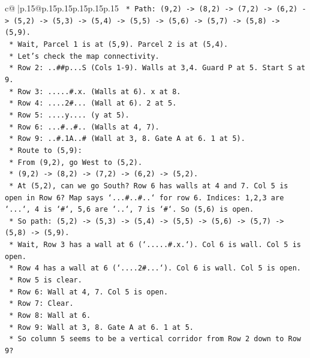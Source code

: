\documentclass{article}
\begin{document}
{\begin{supertabular}{c@{$\;$}|p{.15\linewidth}@{}p{.15\linewidth}p{.15\linewidth}p{.15\linewidth}p{.15\linewidth}p{.15\linewidth}}
{{{\texttt{    *   Path: (9,2) {-}> (8,2) {-}> (7,2) {-}> (6,2) {-}> (5,2) {-}> (5,3) {-}> (5,4) {-}> (5,5) {-}> (5,6) {-}> (5,7) {-}> (5,8) {-}> (5,9).} \\
\texttt{    *   Wait, Parcel 1 is at (5,9). Parcel 2 is at (5,4).} \\
\texttt{    *   Let's check the map connectivity.} \\
\texttt{        *   Row 2: ..\#\#p...S (Cols 1{-}9). Walls at 3,4. Guard P at 5. Start S at 9.} \\
\texttt{        *   Row 3: .....\#.x. (Walls at 6). x at 8.} \\
\texttt{        *   Row 4: ....2\#... (Wall at 6). 2 at 5.} \\
\texttt{        *   Row 5: ....y.... (y at 5).} \\
\texttt{        *   Row 6: ...\#..\#.. (Walls at 4, 7).} \\
\texttt{        *   Row 9: ..\#.1A..\# (Wall at 3, 8. Gate A at 6. 1 at 5).} \\
\texttt{    *   Route to (5,9):} \\
\texttt{        *   From (9,2), go West to (5,2).} \\
\texttt{        *   (9,2) {-}> (8,2) {-}> (7,2) {-}> (6,2) {-}> (5,2).} \\
\texttt{        *   At (5,2), can we go South? Row 6 has walls at 4 and 7. Col 5 is open in Row 6? Map says `...\#..\#..` for row 6. Indices: 1,2,3 are `...`, 4 is `\#`, 5,6 are `..`, 7 is `\#`. So (5,6) is open.} \\
\texttt{        *   So path: (5,2) {-}> (5,3) {-}> (5,4) {-}> (5,5) {-}> (5,6) {-}> (5,7) {-}> (5,8) {-}> (5,9).} \\
\texttt{        *   Wait, Row 3 has a wall at 6 (`.....\#.x.`). Col 6 is wall. Col 5 is open.} \\
\texttt{        *   Row 4 has a wall at 6 (`....2\#...`). Col 6 is wall. Col 5 is open.} \\
\texttt{        *   Row 5 is clear.} \\
\texttt{        *   Row 6: Wall at 4, 7. Col 5 is open.} \\
\texttt{        *   Row 7: Clear.} \\
\texttt{        *   Row 8: Wall at 6.} \\
\texttt{        *   Row 9: Wall at 3, 8. Gate A at 6. 1 at 5.} \\
\texttt{        *   So column 5 seems to be a vertical corridor from Row 2 down to Row 9?} \\
}}}
\end{supertabular}}
\end{document}
